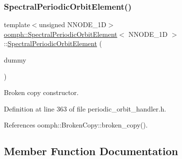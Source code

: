 \subsubsection{\texorpdfstring{Spectral\+Periodic\+Orbit\+Element()}{SpectralPeriodicOrbitElement()}\hspace{0.1cm}{\footnotesize\ttfamily [2/2]}}
{\footnotesize\ttfamily template$<$unsigned N\+N\+O\+D\+E\+\_\+1D$>$ \\
\hyperlink{classoomph_1_1SpectralPeriodicOrbitElement}{oomph\+::\+Spectral\+Periodic\+Orbit\+Element}$<$ N\+N\+O\+D\+E\+\_\+1D $>$\+::\hyperlink{classoomph_1_1SpectralPeriodicOrbitElement}{Spectral\+Periodic\+Orbit\+Element} (\begin{DoxyParamCaption}\item[{const \hyperlink{classoomph_1_1SpectralPeriodicOrbitElement}{Spectral\+Periodic\+Orbit\+Element}$<$ N\+N\+O\+D\+E\+\_\+1D $>$ \&}]{dummy }\end{DoxyParamCaption})\hspace{0.3cm}{\ttfamily [inline]}}



Broken copy constructor. 



Definition at line 363 of file periodic\+\_\+orbit\+\_\+handler.\+h.



References oomph\+::\+Broken\+Copy\+::broken\+\_\+copy().



\subsection{Member Function Documentation}
\mbox{\label{classoomph_1_1SpectralPeriodicOrbitElement_a0468d601cfa2cda0a7fc3312575bb252}} 
